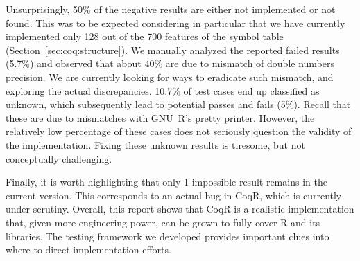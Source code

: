 \documentclass[
    sigplan,
    10pt,
    review, %
    natbib=false %
 ]{acmart}
\newcommand\et[1]{\todo[color=blue!20,size=\scriptsize]{#1}}
\newcommand\td[1]{\todo[color=green!20,size=\scriptsize]{#1}}
\newcommand\CoqR{CoqR}
\begin{document}
Unsurprisingly, 50\% of the negative results are either \textsf{not implemented} or \textsf{not found}. This was to be expected considering in particular that we have currently implemented only 128 out of the 700 features of the symbol table (Section~\ref{sec:coq:structure}).
%
We manually analyzed the reported failed results (5.7\%) and observed that about 40\% are due to mismatch of double numbers precision. We are currently looking for ways to eradicate such mismatch, and exploring the actual discrepancies.
%
10.7\% of test cases end up classified as \textsf{unknown}, which subsequently lead to potential passes and fails (5\%).
Recall that these are due to mismatches with GNU~R's pretty printer. However, the relatively low percentage of these cases does not seriously question the validity of the implementation. Fixing these unknown results is tiresome, but not conceptually challenging.


Finally, it is worth highlighting that only 1 \textsf{impossible} result remains in the current version.  This corresponds to an actual bug in \CoqR{}, which is currently under scrutiny.
Overall, this report shows that \CoqR{} is a realistic implementation that, given more engineering power, can be grown to fully cover R and its libraries. The testing framework we developed provides important clues into where to direct implementation efforts.
\end{document}
